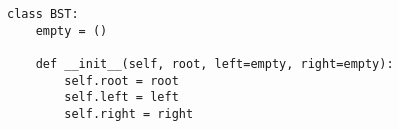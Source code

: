 \begin{lstlisting}
class BST:
    empty = ()

    def __init__(self, root, left=empty, right=empty):
        self.root = root
        self.left = left
        self.right = right
\end{lstlisting}
